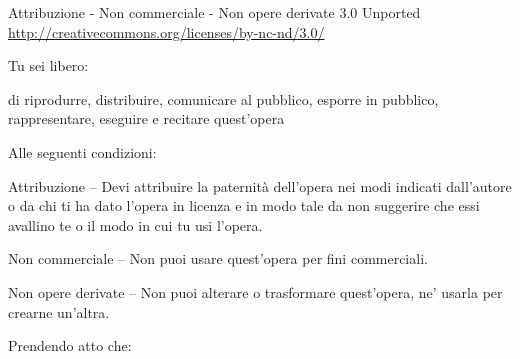 
\vspace*{-2\baselineskip}

{\smaller\setlength{\parindent}{0pt}%
\raggedright\label{copyright-details}
{\setlength{\parskip}{5pt}%
\centering

{\large\ccbyncnd}
\bigskip

Attribuzione - Non commerciale - Non opere derivate 3.0 Unported\\
\href{http://creativecommons.org/licenses/by-nc-nd/3.0/}{http://creativecommons.org/licenses/by-nc-nd/3.0/}

}
\bigskip

Tu sei libero:
\vspace*{-\baselineskip}

\begin{packeditemize}
\item di riprodurre, distribuire, comunicare al pubblico, esporre in pubblico, rappresentare, eseguire e recitare quest'opera
\end{packeditemize}

Alle seguenti condizioni:
\vspace*{-\baselineskip}

\begin{packeditemize}
\item Attribuzione -- Devi attribuire la paternità dell'opera nei modi indicati dall'autore o da chi ti ha dato l'opera in licenza e in modo tale da non suggerire che essi avallino te o il modo in cui tu usi l'opera.
\item Non commerciale -- Non puoi usare quest'opera per fini commerciali.
\item Non opere derivate -- Non puoi alterare o trasformare quest'opera, ne' usarla per crearne un'altra.
\end{packeditemize}

Prendendo atto che:
\vspace*{-\baselineskip}

}
